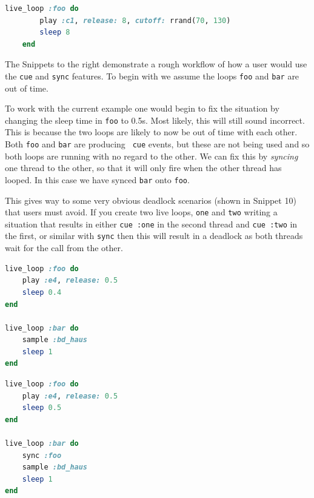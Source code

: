 \documentclass[11pt]{scrartcl}
\begin{document}
\begin{minipage}{\textwidth}
	\begin{lstlisting}[language = ruby]
    live_loop :foo do
        play :c1, release: 8, cutoff: rrand(70, 130)
        sleep 8
    end
	\end{lstlisting}
\end{minipage}

\clearpage
\begin{multicols}{2}
The Snippets to the right demonstrate a rough workflow of how a user would use 
the \texttt{cue} and \texttt{sync} features. To begin with we assume the loops 
\texttt{foo} and \texttt{bar} are out of time.

To work with the current example one would begin to fix the situation by 
changing the sleep time in \texttt{foo} to 0.5s. Most likely, this will still 
sound incorrect. This is because the two loops are likely to now be out of 
time with each other. Both \texttt{foo} and \texttt{bar} are producing \texttt{
cue} events, but these are not being used and so both loops are running with 
no regard to the other. We can fix this by \emph{syncing} one thread to the 
other, so that it will only fire when the other thread has looped. In this 
case we have synced \texttt{bar} onto \texttt{foo}.

This gives way to some very obvious deadlock scenarios (shown in Snippet 10) 
that users must avoid. If you create two live loops, \texttt{one} and 
\texttt{two} writing a situation that results in either \texttt{cue :one} in the 
second thread and \texttt{cue :two} in the first, or similar with \texttt{sync} 
then this will result in a deadlock as both threads wait for the call from the 
other.
	\begin{minipage}{0.5\textwidth}

		\begin{minipage}{\textwidth}
			\begin{lstlisting}[language = ruby]
live_loop :foo do
    play :e4, release: 0.5
    sleep 0.4
end

live_loop :bar do
    sample :bd_haus
    sleep 1
end
			\end{lstlisting}
		\end{minipage}

		\begin{minipage}{\textwidth}
			\begin{lstlisting}[language = ruby]
live_loop :foo do
    play :e4, release: 0.5
    sleep 0.5
end

live_loop :bar do
    sync :foo
    sample :bd_haus
    sleep 1
end
			\end{lstlisting}
		\end{minipage}

	\end{minipage}
\end{multicols}
\end{document}
